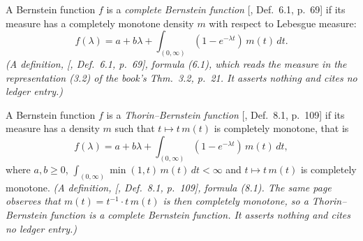 \begin{definition}
\label{def:complete-bernstein}
\leanok
A Bernstein function $f$ is a \emph{complete Bernstein function}
[, Def.~6.1, p.~69] if its \Levy{} measure has a
completely monotone density $m$ with respect to Lebesgue measure:
\[
  f(\lambda) = a + b\lambda + \int_{(0,\infty)}(1 - e^{-\lambda t})\,m(t)\,dt .
\]
\statusT\quad\emph{(A definition, [, Def.~6.1, p.~69], formula (6.1),
which reads the \Levy{} measure in the representation (3.2) of the book's Thm.~3.2, p.~21. It
asserts nothing and cites no ledger entry.)}
\end{definition}

\begin{definition}
\label{def:thorin-bernstein}
\leanok
{}
A Bernstein function $f$ is a \emph{Thorin--Bernstein function}
[, Def.~8.1, p.~109] if its \Levy{} measure has a density
$m$ such that $t \mapsto t\,m(t)$ is completely monotone, that is
\[
  f(\lambda) = a + b\lambda + \int_{(0,\infty)}(1 - e^{-\lambda t})\,m(t)\,dt,
\]
where $a, b \ge 0$, $\int_{(0,\infty)}\min(1, t)\,m(t)\,dt < \infty$ and $t \mapsto t\,m(t)$ is
completely monotone.
\statusT\quad\emph{(A definition, [, Def.~8.1, p.~109], formula (8.1).
The same page observes that $m(t) = t^{-1}\cdot t\,m(t)$ is then completely monotone, so a
Thorin--Bernstein function is a complete Bernstein function. It asserts nothing and cites no ledger
entry.)}
\end{definition}

